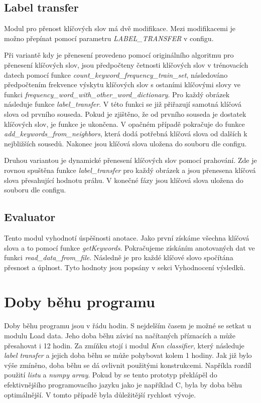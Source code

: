 \documentclass[czech,BP]{thesiskiv}
\begin{document}
\subsection{Label transfer}
\par Modul pro přenost klíčových slov má dvě modifikace. Mezi modifikacemi je možno přepínat pomocí parametru \textit{LABEL\_TRANSFER} v configu. 

\par Při variantě kdy je přenesení provedeno pomocí originálního algoritmu pro přenesení klíčových slov, jsou předpočteny četnosti klíčových slov v trénovacích datech pomocí funkce \textit{count\_keyword\_frequency\_train\_set}, následováno předpočtením frekvence výskytu klíčových slov s ostaními klíčovými slovy ve funkci \textit{frequency\_word\_with\_other\_word\_dictionary}. Pro každý obrázek následuje funkce \textit{label\_transfer}. V této funkci se již přiřazují samotná klíčová slova od prvního souseda. Pokud je zjištěno, že od prvního souseda je dostatek klíčových slov, je funkce je ukončena. V opačném případě pokračuje do funkce \textit{add\_keywords\_from\_neighbors}, která dodá potřebná klíčová slova od dalších k nejbližších sousedů. Nakonec jsou klíčová slova uložena do souboru dle configu.

\par Druhou variantou je dynamické přenesení klíčových slov pomocí prahování. Zde je rovnou spuštěna funkce \textit{label\_transfer} pro každý obrázek a jsou přenesena klíčová slova přesahující hodnotu práhu. V konečné fázy jsou klíčová slova uložena do souboru dle configu. 
  

\subsection{Evaluator}
\par Tento modul vyhodnotí úspěšnosti anotace. Jako první získáme všechna klíčová slova a to pomocí funkce \textit{getKeywords}. Pokračujeme získáním anotovaných dat ve funkci \textit{read\_data\_from\_file}.  Následně je pro každé klíčové slovo spočítána přesnost a úplnost. Tyto hodnoty jsou popsány v sekci Vyhodnocení výsledků.

\section{Doby běhu programu}
\par Doby běhu programu jsou v řádu hodin. S nejdelším časem je možné se setkat u modulu Load data. Jeho doba běhu závisí na načítaných příznacích a může přesahovat i 12 hodin. Za zmíňku stojí i modul \textit{Knn classifier}, který následuje \textit{label transfer} a jejich doba běhu se může pohybovat kolem 1 hodiny. Jak již bylo výše zmíněno, doba běhu se dá ovlivnit použitými konstrukcemi. Napříkla rozdíl použití \textit{listu} a \textit{numpy array}.
Pokud by se tento prototyp překlápěl do efektivnějšího programovacího jazyku jako je například C, byla by doba běhu optimálnější. V tomto případě byla důležitější rychlost vývoje.
\end{document}
